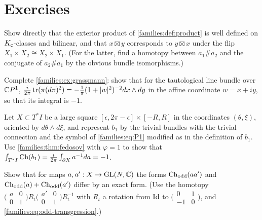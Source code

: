 \section{Exercises}

\begin{exercise}\label{families:ex:ext-product}
  Show directly that the exterior product of \cref{families:def:product} is
  well defined on $K_{\mathrm{c}}$-classes and bilinear, and that $x\boxtimes y$
  corresponds to $y\boxtimes x$ under the flip $X_1\times X_2\cong X_2\times
  X_1$. (For the latter, find a homotopy between $a_1\#a_2$ and the
  conjugate of $a_2\#a_1$ by the obvious bundle isomorphisms.)
\end{exercise}

\begin{exercise}\label{families:ex:CP1}
  Complete \cref{families:ex:grassmann}: show that for the tautological line
  bundle over $\mathbb{C} P^1$, $\frac{i}{2\pi}\operatorname{tr}(\pi(d\pi)^2)=-\frac{1}{\pi}(1+\lvert w\rvert^2)^{-2}dx\wedge dy$ in the affine coordinate $w=x+iy$, so that its integral
  is $-1$.
\end{exercise}

\begin{exercise}\label{families:ex:bott-chern}
  Let $X\subset T^*I$ be a large square $[\epsilon,2\pi-\epsilon]\times[-R,R]$
  in the coordinates $(\theta,\xi)$, oriented by $d\theta\wedge d\xi$, and
  represent $b_1$ by the trivial bundles with the trivial connection and the
  symbol of \eqref{families:eq:P1} modified as in the definition of $b_1$.
  Use \cref{families:thm:fedosov} with $\varphi=1$ to show that
  $\int_{T^*I}\operatorname{Ch}(b_1)=\frac{i}{2\pi}\int_{\partial X}a^{-1}da=-1$.
\end{exercise}

\begin{exercise}\label{families:ex:odd-product}
  Show that for maps $a,a':X\to\operatorname{GL}(N,\mathbb{C})$ the forms $\operatorname{Ch}_{\mathrm{odd}}(aa')$ and
  $\operatorname{Ch}_{\mathrm{odd}}(a)+\operatorname{Ch}_{\mathrm{odd}}(a')$ differ by an exact form. (Use the homotopy
  $\bigl(\begin{smallmatrix}a&0\\0&1\end{smallmatrix}\bigr)R_t
  \bigl(\begin{smallmatrix}a'&0\\0&1\end{smallmatrix}\bigr)R_t^{-1}$ with
  $R_t$ a rotation from $\operatorname{Id}$ to $\bigl(\begin{smallmatrix}0&1\\-1&0
  \end{smallmatrix}\bigr)$, and \eqref{families:eq:odd-transgression}.)
\end{exercise}


